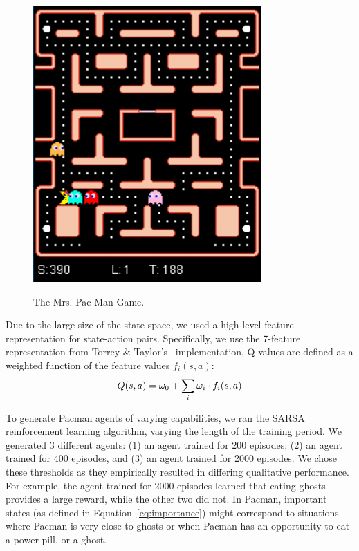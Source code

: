 \begin{figure}
	\centering
	\includegraphics[width=0.4\columnwidth]{figs/pacman1.pdf}\\
	\caption{The Mrs. Pac-Man Game.}
	\label{fig:pacman}
	\vspace{-0.4cm}
\end{figure}

Due to the large size of the state space, we used a high-level feature representation for state-action pairs. Specifically, we use the 7-feature representation from Torrey \& Taylor's~ implementation. Q-values are defined as a weighted function of the feature values $ f_{i}(s,a)$:
\begin{equation}
Q(s,a)=\omega_{0}+\sum_{i}{\omega_{i} \cdot f_{i}(s,a)}
\label{e:q}
\vspace{-0.3cm}
\end{equation}

To generate Pacman agents of varying capabilities, we ran the SARSA reinforcement learning algorithm, varying the length of the training period. We generated 3 different agents: (1) an agent trained for 200 episodes; (2) an agent trained for 400 episodes, and (3) an agent trained for 2000 episodes. We chose these thresholds as they empirically resulted in differing qualitative performance. For example, the agent trained for 2000 episodes learned that eating ghosts provides a large reward, while the other two did not. In Pacman, important states (as defined in Equation~\ref{eq:importance}) might correspond to situations where Pacman is very close to ghosts or  when Pacman has an opportunity to eat a power pill, or a ghost. 



